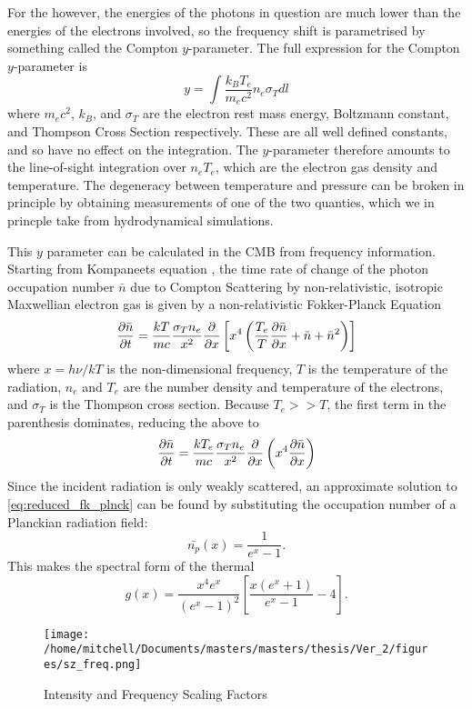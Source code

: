 For the \sze however, the energies of the photons in question are much lower than the energies of the electrons involved, so the frequency shift is parametrised by something called the Compton $y$-parameter. The full expression for the Compton $y$-parameter is 
\begin{equation}
y = \int \frac{k_B T_e}{m_e c^2} n_e \sigma_T d \mathit{l}
\label{eqn:y_param}
\end{equation}
where $m_e c^2$, $k_B$, and $\sigma_T$ are the electron rest mass energy, Boltzmann constant, and Thompson Cross Section respectively. These are all well defined constants, and so have no effect on the integration. The $y$-parameter therefore amounts to the line-of-sight integration over $n_e T_e$, which are the electron gas density and temperature. The degeneracy between temperature and pressure can be broken in principle by obtaining measurements of one of the two quanties, which we in princple take from hydrodynamical simulations.

This $y$ parameter can be calculated in the CMB from frequency information. Starting from Kompaneets equation \citep{1957JETP....4..730K}, the time rate of change of the photon occupation number $\bar{n}$ due to Compton Scattering by non-relativistic, isotropic Maxwellian electron gas is given by a non-relativistic Fokker-Planck Equation \citep{1995ARA&A..33..541R}
\begin{equation}
\pdv{\bar{n}}{t} = \frac{kT}{mc} \frac{\sigma_T n_e}{x^2} \pdv{x} \left[ x^4 \left( \frac{T_e}{T} \pdv{\bar{n}}{x} + \bar{n} + \bar{n}^2 \right) \right]
\label{eq:fk_plnck}
\end{equation}
where $x = h \nu / k T$ is the non-dimensional frequency, $T$ is the temperature of the radiation, $n_e$ and $T_e$ are the number density and temperature of the electrons, and $\sigma_T$ is the Thompson cross section. Because $T_e >> T$, the first term in the parenthesis dominates, reducing the above to 
\begin{equation}
\pdv{\bar{n} }{t} = \frac{k T_e}{m c} \frac{\sigma_T n_e}{x^2} \pdv{x} \left(x^4 \pdv{\bar{n}}{x} \right)
\label{eq:reduced_fk_plnck}
\end{equation}
Since the incident radiation is only weakly scattered, an approximate solution to \ref{eq:reduced_fk_plnck} can be found by substituting the occupation number of a Planckian radiation field:
\begin{equation}
\bar{n_p}(x) = \frac{1}{e^x - 1} .
\label{eq:plnk_occupation_no}
\end{equation}
This makes the spectral form of the thermal \sze
\begin{equation}
g(x) = \frac{x^4 e^x}{(e^x-1)^2} \left[ \frac{x (e^x+1)}{e^x -1 } - 4 \right].
\end{equation}
\begin{figure}[h!]
\centering
\texttt{[image: /home/mitchell/Documents/masters/masters/thesis/Ver\_2/figures/sz\_freq.png]}
\caption{\sze Intensity and Frequency Scaling Factors}
\label{fig:sz}
\end{figure}

